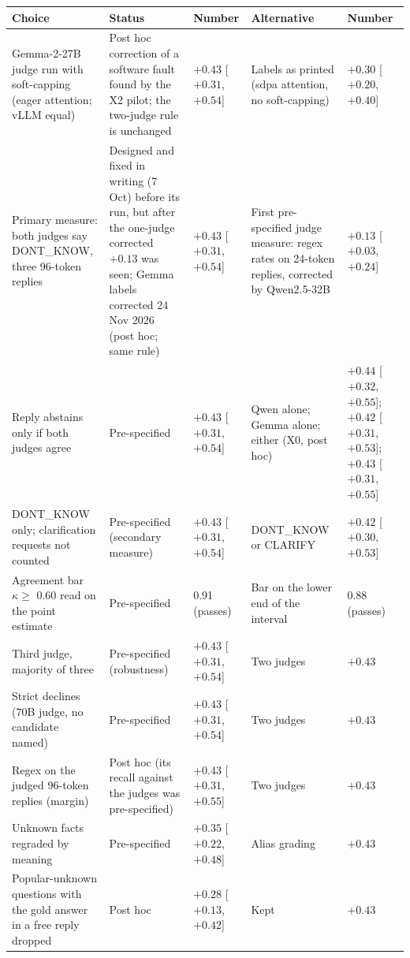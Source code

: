 \begin{table}[h]
\centering\scriptsize\setlength{\tabcolsep}{3pt}
\begin{tabular}{p{4.4cm}p{3.2cm}p{2.5cm}p{3.0cm}p{2.5cm}}
\toprule
Choice & Status & Number & Alternative & Number \\
\midrule
Gemma-2-27B judge run with soft-capping (eager attention; vLLM equal) & Post hoc correction of a software fault found by the X2 pilot; the two-judge rule is unchanged & $+0.43$ [$+0.31$, $+0.54$] & Labels as printed (sdpa attention, no soft-capping) & $+0.30$ [$+0.20$, $+0.40$] \\
Primary measure: both judges say DONT\_KNOW, three 96-token replies & Designed and fixed in writing (7 Oct) before its run, but after the one-judge corrected $+0.13$ was seen; Gemma labels corrected 24 Nov 2026 (post hoc; same rule) & $+0.43$ [$+0.31$, $+0.54$] & First pre-specified judge measure: regex rates on 24-token replies, corrected by Qwen2.5-32B & $+0.13$ [$+0.03$, $+0.24$] \\
Reply abstains only if both judges agree & Pre-specified & $+0.43$ [$+0.31$, $+0.54$] & Qwen alone; Gemma alone; either (X0, post hoc) & $+0.44$ [$+0.32$, $+0.55$]; $+0.42$ [$+0.31$, $+0.53$]; $+0.43$ [$+0.31$, $+0.55$] \\
DONT\_KNOW only; clarification requests not counted & Pre-specified (secondary measure) & $+0.43$ [$+0.31$, $+0.54$] & DONT\_KNOW or CLARIFY & $+0.42$ [$+0.30$, $+0.53$] \\
Agreement bar $\kappa \geq$ 0.60 read on the point estimate & Pre-specified & 0.91 (passes) & Bar on the lower end of the interval & 0.88 (passes) \\
Third judge, majority of three & Pre-specified (robustness) & $+0.43$ [$+0.31$, $+0.54$] & Two judges & $+0.43$ \\
Strict declines (70B judge, no candidate named) & Pre-specified & $+0.43$ [$+0.31$, $+0.54$] & Two judges & $+0.43$ \\
Regex on the judged 96-token replies (margin) & Post hoc (its recall against the judges was pre-specified) & $+0.43$ [$+0.31$, $+0.55$] & Two judges & $+0.43$ \\
Unknown facts regraded by meaning & Pre-specified & $+0.35$ [$+0.22$, $+0.48$] & Alias grading & $+0.43$ \\
Popular-unknown questions with the gold answer in a free reply dropped & Post hoc & $+0.28$ [$+0.13$, $+0.42$] & Kept & $+0.43$ \\

\end{tabular}
\end{table}
